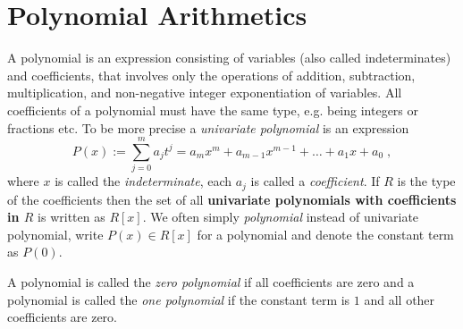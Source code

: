 \section{Polynomial Arithmetics}
A polynomial is an expression consisting of variables (also called indeterminates) and coefficients, that involves only the operations of addition, subtraction, multiplication, and non-negative integer exponentiation of variables. All coefficients of a polynomial must have the same type, e.g. being integers or fractions etc. To be more precise a \textit{univariate polynomial} is an expression
\begin{equation}
P(x) := \sum _{j = 0} ^{m}{a} _{j}{t} ^{j} ={a} _{m}x^m +{a} _{m-1} x^{m-1} + \dots + a_1 x + a_0 \;,
\end{equation}
where $x$ is called the \textit{indeterminate}, each $ a_j$ is called a \textit{coefficient}. If $R$ is the type of the coefficients then the set of all \textbf{univariate polynomials with coefficients in $R$} is written as $R[x]$. We often simply \textit{polynomial} instead of univariate polynomial, write $ P (x) \in R[x]$ for a polynomial and denote the constant term as $ P(0)$. 

A polynomial is called the \textit{zero polynomial} if all coefficients are zero and a polynomial is called the \textit{one polynomial} if the constant term is $1$ and all other coefficients are zero.

